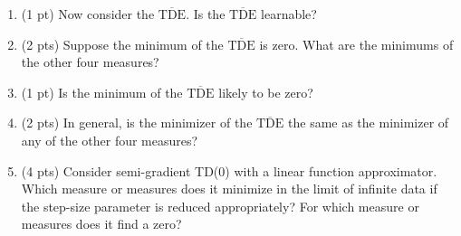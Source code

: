 \documentclass[main.tex]{subfiles}
\begin{document}
{\begin{enumerate}
    \item[(o)] (1 pt) Now consider the $\overline{\text{TDE}}$. Is the $\overline{\text{TDE}}$ learnable?
    \item[(p)] (2 pts) Suppose the minimum of the $\overline{\text{TDE}}$ is zero. What are the minimums of the other four measures?
    \item[(q)] (1 pt) Is the minimum of the $\overline{\text{TDE}}$ likely to be zero?
    \item[(r)] (2 pts) In general, is the minimizer of the $\overline{\text{TDE}}$ the same as the minimizer of any of the other four measures?
    \item[(s)] (4 pts) Consider semi-gradient TD(0) with a linear function approximator. Which measure or measures does it minimize in the limit of infinite data if the step-size parameter is reduced appropriately? For which measure or measures does it find a zero?
\end{enumerate}
}

\sol
\end{document}
